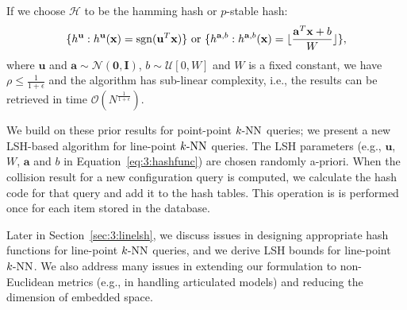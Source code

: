 If we choose $\mathcal H$ to be the hamming hash or $p$-stable hash:
\begin{equation}
  \begin{aligned}
    \label{eq:3:hashfunc}
    \{h^{\mathbf u} : h^{\mathbf u}(\mathbf x) = \operatorname{sgn}(\mathbf u^T \mathbf x)\} \text{\ or\ } \{h^{\mathbf a, b} : h^{\mathbf a, b}(\mathbf x) = \lfloor \frac{\mathbf a^T \mathbf x + b}{W}\rfloor\},
  \end{aligned}
\end{equation}
where $\mathbf u$ and $\mathbf a \sim \mathcal N(\mathbf 0, \mathbf I)$, $b \sim \mathcal U[0, W]$ and $W$ is a fixed constant, we have $\rho \leq \frac{1}{1+\epsilon}$ and the algorithm has sub-linear complexity, i.e., the results can be retrieved in time $\mathcal O(N^{\frac{1}{1+\epsilon}})$.


We build on these prior results for point-point $k\text{-NN}$ queries; we present a new LSH-based algorithm for line-point $k\text{-NN}$ queries. The LSH parameters (e.g., $\mathbf u$, $W$, $\mathbf a$ and $b$ in Equation~\ref{eq:3:hashfunc}) are chosen randomly a-priori. When the collision result for a new configuration query is computed, we calculate the hash code for that query and add it to the hash tables. This operation is is performed once for each item stored in the database.

Later in Section~\ref{sec:3:linelsh}, we discuss issues in designing appropriate hash functions for line-point $k\text{-NN}$ queries, and we derive LSH bounds for line-point $k\text{-NN}$. We also address many issues in extending our formulation to non-Euclidean metrics (e.g., in handling articulated models) and reducing the dimension of embedded space.

